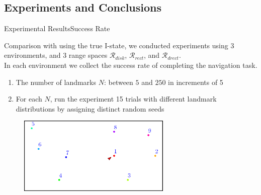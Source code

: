\documentclass[10pt]{beamer}
\begin{document}

\subsection[Experiments]{Experiments and Conclusions}
\begin{frame}{Experimental Results}{Success Rate}
 \small{Comparison with using the true I-state, we conducted experiments using 3
 environments, and 3 range spaces $\mathcal{R}_{disk}$, $\mathcal{R}_{rect}$,
 and  $\mathcal{R}_{drect}$. \\
 In each environment we collect the success rate of completing the navigation
 task. 
 \begin{enumerate}
 \item The number of landmarks $N$: between $5$ and $250$ in increments of 5
 \item For each $N$, run the experiment 15 trials with different landmark
   distributions by assigning distinct random seeds
 \end{enumerate}
}
\begin{figure}
  \centering
  \includegraphics[width=0.65\textwidth]{figs/blank}
\end{figure}
\end{frame}
\end{document}
